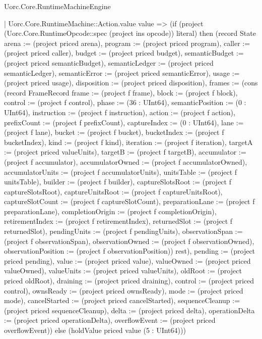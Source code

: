 \begin{lexlean}{Uorc.Core.RuntimeMachineEngine}
\begin{semanticmodule}
{              | Uorc.Core.RuntimeMachine::Action.value value => (if (project (Uorc.Core.RuntimeOpcode::spec (project ins opcode)) literal) then (record State {arena := (project priced arena), program := (project priced program), caller := (project priced caller), budget := (project priced budget), semanticBudget := (project priced semanticBudget), semanticLedger := (project priced semanticLedger), semanticError := (project priced semanticError), usage := (project priced usage), disposition := (project priced disposition), frames := (cons (record FrameRecord {frame := (project f frame), block := (project f block), control := (project f control), phase := (36 : UInt64), semanticPosition := (0 : UInt64), instruction := (project f instruction), action := (project f action), prefixCount := (project f prefixCount), captureIndex := (0 : UInt64), lane := (project f lane), bucket := (project f bucket), bucketIndex := (project f bucketIndex), kind := (project f kind), iteration := (project f iteration), targetA := (project priced valueUnits), targetB := (project f targetB), accumulator := (project f accumulator), accumulatorOwned := (project f accumulatorOwned), accumulatorUnits := (project f accumulatorUnits), unitsTable := (project f unitsTable), builder := (project f builder), captureSlotsRoot := (project f captureSlotsRoot), captureUnitsRoot := (project f captureUnitsRoot), captureSlotCount := (project f captureSlotCount), preparationLane := (project f preparationLane), completionOrigin := (project f completionOrigin), retirementIndex := (project f retirementIndex), returnedSlot := (project f returnedSlot), pendingUnits := (project f pendingUnits), observationSpan := (project f observationSpan), observationOwned := (project f observationOwned), observationPosition := (project f observationPosition)}) rest), pending := (project priced pending), value := (project priced value), valueOwned := (project priced valueOwned), valueUnits := (project priced valueUnits), oldRoot := (project priced oldRoot), draining := (project priced draining), control := (project priced control), ownsReady := (project priced ownsReady), mode := (project priced mode), cancelStarted := (project priced cancelStarted), sequenceCleanup := (project priced sequenceCleanup), delta := (project priced delta), operationDelta := (project priced operationDelta), overflowEvent := (project priced overflowEvent)}) else (holdValue priced value (5 : UInt64)))
}
\end{semanticmodule}
\end{lexlean}

